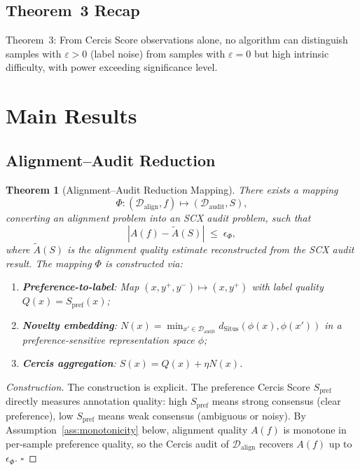 \documentclass[12pt,a4paper]{article}
\newtheorem{theorem}{Theorem}[section]
\newcommand{\cD}{\mathcal{D}}
\newcommand{\Situs}{\mathrm{Situs}}
\begin{document}
\subsection{Theorem~3 Recap}

Theorem~3: From Cercis Score observations alone, no algorithm can distinguish
samples with $\varepsilon>0$ (label noise) from samples with $\varepsilon=0$
but high intrinsic difficulty, with power exceeding significance level.

\section{Main Results}

\subsection{Alignment--Audit Reduction}

\begin{theorem}[Alignment--Audit Reduction Mapping]
\label{thm:reduction}
There exists a mapping
\begin{equation}\label{eq:Phi}
    \Phi: (\cD_{\mathrm{align}}, f) \mapsto (\cD_{\mathrm{audit}}, S),
\end{equation}
converting an alignment problem into an SCX audit problem, such that
\begin{equation}\label{eq:fidelity}
    |A(f) - \tilde{A}(S)| \;\leq\; \epsilon_\Phi,
\end{equation}
where $\tilde{A}(S)$ is the alignment quality estimate reconstructed from the
SCX audit result.  The mapping $\Phi$ is constructed via:
\begin{enumerate}[label=(\roman*)]
    \item \textbf{Preference-to-label}: Map $(x,y^+,y^-)\mapsto(x,y^+)$ with
          label quality $Q(x)=S_{\mathrm{pref}}(x)$;
    \item \textbf{Novelty embedding}: $N(x)=\min_{x'\in\cD_{\mathrm{audit}}}
          d_{\Situs}(\phi(x),\phi(x'))$ in a preference-sensitive
          representation space $\phi$;
    \item \textbf{Cercis aggregation}: $S(x)=Q(x)+\eta N(x)$.
\end{enumerate}
\end{theorem}

\begin{proof}[Construction]
The construction is explicit.  The preference Cercis Score $S_{\mathrm{pref}}$
directly measures annotation quality: high $S_{\mathrm{pref}}$ means strong
consensus (clear preference), low $S_{\mathrm{pref}}$ means weak consensus
(ambiguous or noisy).  By Assumption~\ref{ass:monotonicity} below, alignment
quality $A(f)$ is monotone in per-sample preference quality, so the Cercis
audit of $\cD_{\mathrm{align}}$ recovers $A(f)$ up to $\epsilon_\Phi$.
$\square$
\end{proof}
\end{document}
